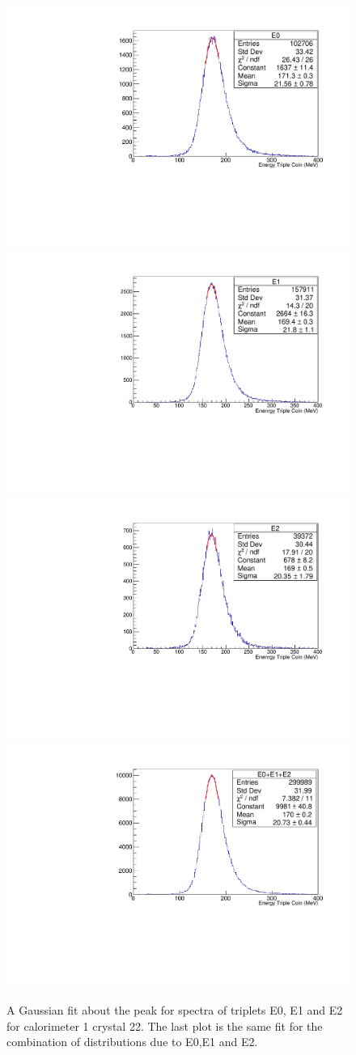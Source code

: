 \documentclass[article,accept,moreauthors,pdftex,10pt,a4paper]{../MDPI_template/Definitions/mdpi}
\begin{document}
\begin{figure}[H]
\centering
\includegraphics[width=7.5 cm]{calo1_E0.pdf}
\includegraphics[width=7.5 cm]{calo1_E1.pdf}\\
\includegraphics[width=7.5 cm]{calo1_E2.pdf}
\includegraphics[width=7.5 cm]{calo1_all.pdf}
\caption{\label{fig3} A Gaussian fit about the peak for spectra of triplets E0, E1 and E2 for calorimeter 1 crystal 22. 
The last plot is the same fit for the combination of distributions due to E0,E1 and E2.}
\end{figure}  
\end{document}
